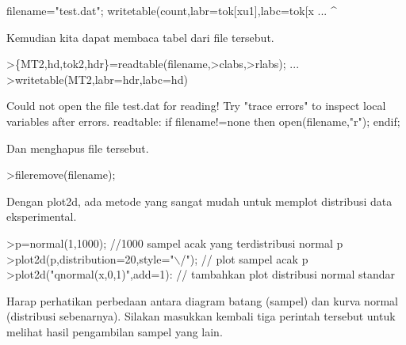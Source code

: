 \documentclass[12pt,arial,letterpaper]{book}
\begin{document}
\begin{eulercomment}
\begin{eulercomment}
\begin{eulercomment}
\begin{eulercomment}
\begin{eulercomment}
\begin{eulercomment}
\begin{eulercomment}
\begin{eulercomment}
\begin{eulercomment}
\begin{eulercomment}
\begin{eulercomment}
\begin{eulercomment}
\begin{eulercomment}
\begin{eulercomment}
\begin{eulercomment}
\begin{eulercomment}
\begin{eulercomment}
\begin{eulercomment}
\begin{eulercomment}
\begin{eulercomment}
\begin{eulercomment}
\begin{eulercomment}
\begin{eulercomment}
\begin{eulercomment}
\begin{eulercomment}
\begin{eulercomment}
\begin{eulercomment}
\begin{eulercomment}
\begin{eulercomment}
\begin{eulercomment}
\begin{eulercomment}
\begin{eulercomment}
\begin{euleroutput}
  filename="test.dat"; writetable(count,labr=tok[xu1],labc=tok[x ...
                                       ^
\end{euleroutput}
\begin{eulercomment}
Kemudian kita dapat membaca tabel dari file tersebut.
\end{eulercomment}
\begin{eulerprompt}
>\{MT2,hd,tok2,hdr\}=readtable(filename,>clabs,>rlabs); ...
>writetable(MT2,labr=hdr,labc=hd)
\end{eulerprompt}
\begin{euleroutput}
  Could not open the file
  test.dat
  for reading!
  Try "trace errors" to inspect local variables after errors.
  readtable:
      if filename!=none then open(filename,"r"); endif;
\end{euleroutput}
\begin{eulercomment}
Dan menghapus file tersebut.
\end{eulercomment}
\begin{eulerprompt}
>fileremove(filename);
\end{eulerprompt}
\begin{eulercomment}
Dengan plot2d, ada metode yang sangat mudah untuk memplot distribusi
data eksperimental.
\end{eulercomment}
\begin{eulerprompt}
>p=normal(1,1000); //1000 sampel acak yang terdistribusi normal p
>plot2d(p,distribution=20,style="\(\backslash\)/"); // plot sampel acak p
>plot2d("qnormal(x,0,1)",add=1): // tambahkan plot distribusi normal standar
\end{eulerprompt}
\begin{eulercomment}
Harap perhatikan perbedaan antara diagram batang (sampel) dan kurva
normal (distribusi sebenarnya). Silakan masukkan kembali tiga perintah
tersebut untuk melihat hasil pengambilan sampel yang lain.

\end{eulercomment}
\end{eulercomment}
\end{eulercomment}
\end{eulercomment}
\end{eulercomment}
\end{eulercomment}
\end{eulercomment}
\end{eulercomment}
\end{eulercomment}
\end{eulercomment}
\end{eulercomment}
\end{eulercomment}
\end{eulercomment}
\end{eulercomment}
\end{eulercomment}
\end{eulercomment}
\end{eulercomment}
\end{eulercomment}
\end{eulercomment}
\end{eulercomment}
\end{eulercomment}
\end{eulercomment}
\end{eulercomment}
\end{eulercomment}
\end{eulercomment}
\end{eulercomment}
\end{eulercomment}
\end{eulercomment}
\end{eulercomment}
\end{eulercomment}
\end{eulercomment}
\end{eulercomment}
\end{eulercomment}
\end{document}
